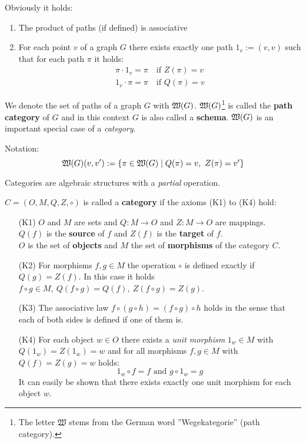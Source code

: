 Obviously it holds:
\begin{enumerate}
\item The product of paths (if defined) is associative
\item For each point $v$ of a graph $G$ there exists exactly one path $1_v :=
(v, v)$ such that for each path $\pi$ it holds:
	\begin{eqnarray*}
  	\pi \cdot 1_v = \pi\quad\text{if }Z(\pi) = v \\
  	1_v \cdot \pi = \pi\quad\text{if }Q(\pi) = v
	\end{eqnarray*}
\end{enumerate}

We denote the set of paths of a graph $G$ with $\mbox{$\mathfrak{W}({G})$}$. 
$\mbox{$\mathfrak{W}({G})$}$\footnote{The letter
$\mathfrak{W}$ stems from the German word ''Wegekategorie'' (path category).} 
is called the {\bf path category} of $G$ and in this context $G$ is also called 
a {\bf schema}. $\mbox{$\mathfrak{W}({G})$}$ is an important special case of a {\em category}.

Notation: 
\[ \mbox{$\mathfrak{W}({G})$}(v, v') := \mbox{$\{\pi \in \mbox{$\mathfrak{W}({G})$} \mid Q(\pi) = v,\ Z(\pi) =
v'\}$} \]

\bigskip
Categories are algebraic structures with a {\em partial} operation.

\begin{definition}
$C = (O, M, Q, Z, \circ)$ is called a {\bf category} if the axioms (K1) to
(K4) hold:
\begin{enumerate}
	\item[(K1)] $O$ and $M$ are sets and $Q: M \to O$ and $Z: M \to O$ are
	mappings.\\
	$Q(f)$ is the {\bf source} of $f$ and $Z(f)$ is the {\bf target} of $f$.\\
	$O$ is the set of {\bf objects} and $M$ the set of {\bf morphisms} of the
	category $C$.
	
	\item[(K2)] For morphisms $f, g \in M$ the operation $\circ$ is defined
	exactly if $Q(g) = Z(f)$. In this case it holds $f \circ g \in M,\ Q(f \circ g)
	= Q(f),\ Z(f \circ g) = Z(g)$.
	
	\item[(K3)] The associative law $f \circ (g \circ h) = (f \circ g) \circ h$
	holds in the sense that each of both sides is defined if one of them is.
	
	\item[(K4)] For each object $w \in O$ there exists a {\em unit morphism} $1_w
	\in M$ with $Q(1_w) = Z(1_w) = w$ and for all morphisms $f, g \in M$ with 
	$Q(f) = Z(g) = w$ holds:
	\[ 1_w \circ f = f\text{ and }g \circ 1_w = g \]
	It can easily be shown that there exists exactly one unit morphism for each
	object $w$.
\end{enumerate}
\end{definition}

